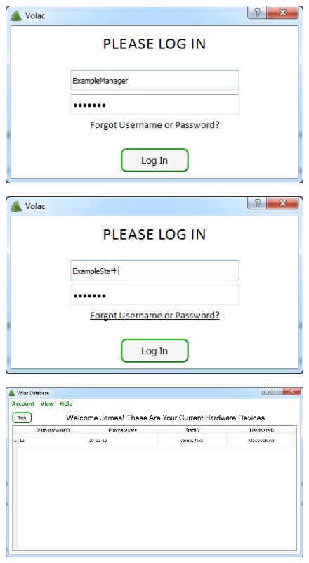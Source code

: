 \begin{figure}[H]
    \includegraphics[width=\textwidth]{./Evaluation/Images/login3.png}
\end{figure}

\begin{figure}[H]
    \includegraphics[width=\textwidth]{./Evaluation/Images/login4.png}
\end{figure}

\begin{figure}[H]
    \includegraphics[width=\textwidth]{./Evaluation/Images/login5.png}
\end{figure}


